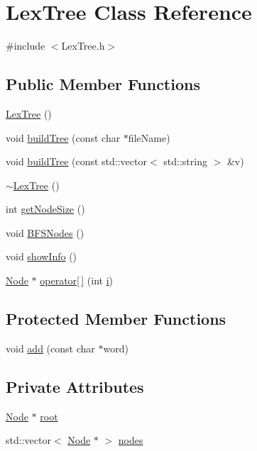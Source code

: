 \hypertarget{class_lex_tree}{\section{Lex\+Tree Class Reference}
\label{class_lex_tree}
}


{\ttfamily \#include $<$Lex\+Tree.\+h$>$}

\subsection*{Public Member Functions}
\begin{DoxyCompactItemize}
\item 
\hyperlink{class_lex_tree_af3cda7ddb26d500e8d56640950bdd56a}{Lex\+Tree} ()
\item 
void \hyperlink{class_lex_tree_ab21f89f388595305a109689657b73e71}{build\+Tree} (const char $\ast$file\+Name)
\item 
void \hyperlink{class_lex_tree_a58cf3b490d563f6e4d660e3712b89248}{build\+Tree} (const std\+::vector$<$ std\+::string $>$ \&v)
\item 
\hyperlink{class_lex_tree_a799bb7ca2ce7ed6f38a2b1dba55fb8b0}{$\sim$\+Lex\+Tree} ()
\item 
int \hyperlink{class_lex_tree_a7f0903e8d4f7c6d43991b28ebcc27dee}{get\+Node\+Size} ()
\item 
void \hyperlink{class_lex_tree_abd14fb87093e963a9934b749fa1acc64}{B\+F\+S\+Nodes} ()
\item 
void \hyperlink{class_lex_tree_a88177006613ef9f737feaccbecfb4519}{show\+Info} ()
\item 
\hyperlink{class_node}{Node} $\ast$ \hyperlink{class_lex_tree_aa893ab8e9e56c1f105deca1d722c57e3}{operator\mbox{[}$\,$\mbox{]}} (int \hyperlink{process__options_8m_a6f6ccfcf58b31cb6412107d9d5281426}{i})
\end{DoxyCompactItemize}
\subsection*{Protected Member Functions}
\begin{DoxyCompactItemize}
\item 
void \hyperlink{class_lex_tree_a589456a144002c42a7042b23c21d31bc}{add} (const char $\ast$word)
\end{DoxyCompactItemize}
\subsection*{Private Attributes}
\begin{DoxyCompactItemize}
\item 
\hyperlink{class_node}{Node} $\ast$ \hyperlink{class_lex_tree_a8090572ccb237634f3f8483305cf878e}{root}
\item 
std\+::vector$<$ \hyperlink{class_node}{Node} $\ast$ $>$ \hyperlink{class_lex_tree_a21f434a67d532c1f6e30d77b7948aada}{nodes}
\end{DoxyCompactItemize}


